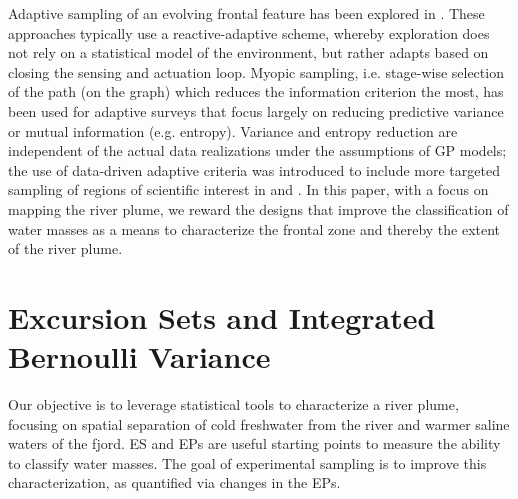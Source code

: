 \documentclass[aoas]{imsart}
\begin{document}
Adaptive sampling of an evolving frontal feature has been explored in
\cite{fronts11,Zhang2012,Pinto2018,costa19}. These approaches
typically use a reactive-adaptive scheme, whereby exploration does not
rely on a statistical model of the environment, but rather adapts
based on closing the sensing and actuation loop. Myopic sampling, i.e. stage-wise selection of
the path (on the graph) which reduces the information criterion the
most, has been used for adaptive surveys
\citep{singh2009efficient,Binney2013} that focus largely on reducing
predictive variance or mutual information (e.g. entropy). Variance and
entropy reduction are independent of the actual data realizations
under the assumptions of GP models; the use of data-driven adaptive
criteria was introduced to include more targeted sampling of regions
of scientific interest in \cite{Low2009} and \cite{fossuminformation}.
In this paper, with a focus on mapping the river plume, we reward the
designs that improve the classification of water masses as a means to
characterize the frontal zone and thereby the extent of the river plume.







\section{Excursion Sets and Integrated Bernoulli Variance}
\label{sec:ESEP}

Our objective is to leverage statistical tools to characterize a river
plume, focusing on spatial separation of cold freshwater from the
river and warmer saline waters of the fjord. ES and EPs are useful
starting points to measure the ability to classify water masses. The
goal of experimental sampling is to improve this
characterization, as quantified via changes in the EPs.
\end{document}
